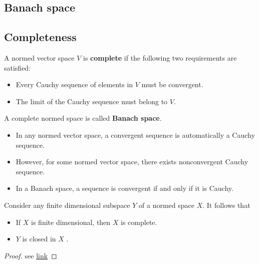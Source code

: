 \begin{refsection}
\section{Banach space}
\subsection{Completeness}
\begin{definition}[complete]\cite[48]{christensen2010functions}
A normed vector space $V$ is \textbf{complete} if the following two requirements are satisfied:
\begin{itemize}
	\item Every Cauchy sequence of elements in $V$ must be convergent.
	\item The limit of the Cauchy sequence must belong to $V$.
\end{itemize}

A complete normed space is called \textbf{Banach space}. 
\end{definition}





\begin{note}\cite[48]{christensen2010functions}
\begin{itemize}
	\item In any normed vector space, a convergent sequence is automatically a Cauchy sequence.
	\item However, for some normed vector space, there exists nonconvergent Cauchy sequence.
	\item In a Banach space, a sequence is convergent if and only if it is Cauchy. 
\end{itemize}	
\end{note}




\begin{theorem}\cite[74]{kreyszig1989introductory}\label{ch:functional-analysis:th:ClosednessAndCompletenessOfFiniteDimensionalNormedSpace}
	Consider any  finite dimensional subspace $Y$ of a normed space $X$. It follows that
\begin{itemize}
	\item If $X$ is finite dimensional, then $X$ is complete. 
	\item $Y$ is closed in $X$ .
\end{itemize}	
\end{theorem}
\begin{proof}
see \href{https://math.stackexchange.com/questions/168275/proof-that-every-finite-dimensional-normed-vector-space-is-complete}{link}
\end{proof}



\end{refsection}
